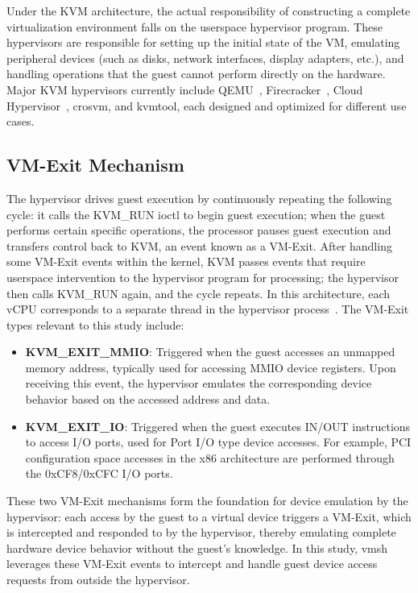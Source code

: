 \begin{ZhChapter}
Under the KVM architecture, the actual responsibility of constructing a complete virtualization environment falls on the userspace hypervisor program. These hypervisors are responsible for setting up the initial state of the VM, emulating peripheral devices (such as disks, network interfaces, display adapters, etc.), and handling operations that the guest cannot perform directly on the hardware. Major KVM hypervisors currently include QEMU~\cite{QEMU}, Firecracker~\cite{Firecracker}, Cloud Hypervisor~\cite{CloudHypervisor}, crosvm, and kvmtool, each designed and optimized for different use cases.

\subsection{VM-Exit Mechanism}
\label{sec:vm-exit}

The hypervisor drives guest execution by continuously repeating the following cycle: it calls the KVM\_RUN ioctl to begin guest execution; when the guest performs certain specific operations, the processor pauses guest execution and transfers control back to KVM, an event known as a VM-Exit. After handling some VM-Exit events within the kernel, KVM passes events that require userspace intervention to the hypervisor program for processing; the hypervisor then calls KVM\_RUN again, and the cycle repeats. In this architecture, each vCPU corresponds to a separate thread in the hypervisor process~\cite{KVMAPI}. The VM-Exit types relevant to this study include:

\begin{itemize}
    \item \textbf{KVM\_EXIT\_MMIO}: Triggered when the guest accesses an unmapped memory address, typically used for accessing MMIO device registers. Upon receiving this event, the hypervisor emulates the corresponding device behavior based on the accessed address and data.
    \item \textbf{KVM\_EXIT\_IO}: Triggered when the guest executes IN/OUT instructions to access I/O ports, used for Port I/O type device accesses. For example, PCI configuration space accesses in the x86 architecture are performed through the 0xCF8/0xCFC I/O ports.
\end{itemize}

These two VM-Exit mechanisms form the foundation for device emulation by the hypervisor: each access by the guest to a virtual device triggers a VM-Exit, which is intercepted and responded to by the hypervisor, thereby emulating complete hardware device behavior without the guest's knowledge. In this study, vmsh leverages these VM-Exit events to intercept and handle guest device access requests from outside the hypervisor.


\end{ZhChapter}
